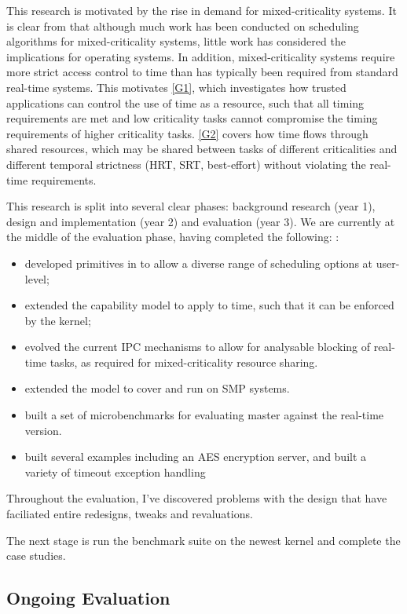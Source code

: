 This research is motivated by the rise in demand for mixed-criticality systems.
It is clear from  that although much work has been conducted on scheduling algorithms for mixed-criticality systems, little work has considered the implications for operating systems.
In addition, mixed-criticality systems require more strict access control to time than has typically been required from standard real-time systems.
This motivates \ref{G1}, which investigates how trusted applications can control the use of time as a resource, such that all timing requirements are met and low criticality tasks cannot compromise the timing requirements of higher criticality tasks.
\ref{G2} covers how time flows through shared resources, which may be shared between tasks of
different criticalities and different temporal strictness (\gls{HRT}, \gls{SRT}, best-effort) without violating the real-time requirements.

This research is split into several clear phases: background research (year 1), design and implementation (year 2) and evaluation (year 3).
We are currently at the middle of the evaluation phase, having completed the following:
:
\begin{itemize}
	\item developed primitives in \selfour to allow a diverse range of scheduling options at user-level;
	\item extended the \selfour capability model to apply to time, such that it can be enforced by the kernel;
	\item evolved the current \selfour \gls{IPC} mechanisms to allow for analysable blocking of real-time tasks, as required for mixed-criticality resource sharing.
        \item extended the model to cover and run on \gls{SMP} systems.
        \item built a set of microbenchmarks for evaluating \selfour master against the real-time version.
        \item built several examples including an AES encryption server, and built a variety of timeout exception handling 
\end{itemize}

Throughout the evaluation, I've discovered problems with the design that have faciliated entire redesigns, tweaks and revaluations. 

The next stage is run the benchmark suite on the newest kernel and complete the case studies.

\subsection{Ongoing Evaluation}

